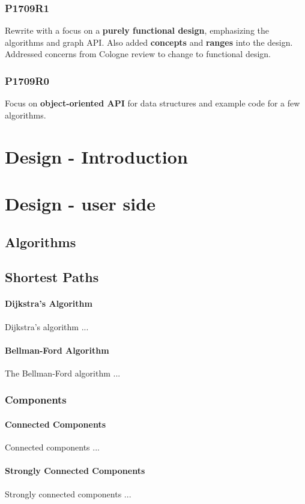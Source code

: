 \documentclass[10pt,onecolumn]{article}
\begin{document}
\subsubsection*{P1709R1}
Rewrite with a focus on a \textbf{purely functional design}, emphasizing the algorithms and graph API. Also added \textbf{concepts} and \textbf{ranges} into the design. Addressed concerns from Cologne review to change to functional design.

\subsubsection*{P1709R0}
Focus on \textbf{object-oriented API} for data structures and example code for a few algorithms.

\section{Design - Introduction}
\section{Design - user side}
\subsection{Algorithms}
\subsection{Shortest Paths}
\paragraph{Dijkstra's Algorithm}
Dijkstra's algorithm \cite{REF_} ...

\paragraph{Bellman-Ford Algorithm}
The Bellman-Ford algorithm \cite{REF_} ...

\subsubsection{Components}
\paragraph{Connected Components}
Connected components \cite{REF_} ...

\paragraph{Strongly Connected Components}
Strongly connected components \cite{REF_} ...
\end{document}
